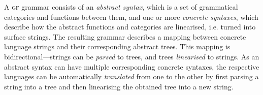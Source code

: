 \documentclass[11pt]{article}
\def\gf{\textsc{gf}}
\newcommand{\todo}[1]{{\color{cyan}\textbf{[TODO: }#1\textbf{]}}}
\begin{document}
A \gf{} grammar consists of an \emph{abstract syntax}, which is a set
of grammatical categories and functions between them, and one or more
\emph{concrete syntaxes}, which describe how the abstract functions
and categories are linearised, i.e. turned into surface strings. The
resulting grammar describes a mapping between concrete language
strings and their corresponding abstract trees. This mapping is
bidirectional---strings can be \emph{parsed} to trees, and trees
\emph{linearised} to strings. As an abstract syntax can have multiple
corresponding concrete syntaxes, the respective languages can be
automatically \emph{translated} from one to the other by first parsing
a string into a tree and then linearising the obtained tree into a new
string. 






\end{document}
